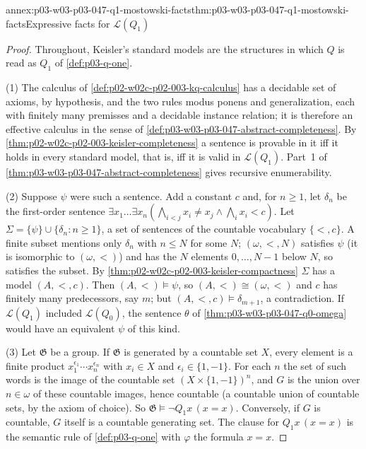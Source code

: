 \begin{annexitem}{annex:p03-w03-p03-047-q1-mostowski-facts}{thm:p03-w03-p03-047-q1-mostowski-facts}{Expressive facts for \(\mathscr L(Q_1)\)}
\begin{proof}
Throughout, Keisler's standard models are the structures in which \(Q\) is
read as \(Q_1\) of \cref{def:p03-q-one}.

(1) The calculus of \cref{def:p02-w02c-p02-003-kq-calculus} has a decidable
set of axioms, by hypothesis, and the two rules modus ponens and
generalization, each with finitely many premisses and a decidable instance
relation; it is therefore an effective calculus in the sense of
\cref{def:p03-w03-p03-047-abstract-completeness}.  By
\cref{thm:p02-w02c-p02-003-keisler-completeness} a sentence is provable in
it iff it holds in every standard model, that is, iff it is valid in
\(\mathscr L(Q_1)\).  Part~1 of
\cref{thm:p03-w03-p03-047-abstract-completeness} gives recursive
enumerability.

(2) Suppose \(\psi\) were such a sentence.  Add a constant \(c\) and, for
\(n\ge1\), let \(\delta_n\) be the first-order sentence
\(\exists x_1\ldots\exists x_n(\bigwedge_{i<j}x_i\ne x_j\land\bigwedge_i x_i<c)\).
Let \(\Sigma=\{\psi\}\cup\{\delta_n:n\ge1\}\), a set of sentences of the
countable vocabulary \(\{<,c\}\).  A finite subset mentions only
\(\delta_n\) with \(n\le N\) for some \(N\); \((\omega,<,N)\) satisfies
\(\psi\) (it is isomorphic to \((\omega,<)\)) and has the \(N\) elements
\(0,\ldots,N-1\) below \(N\), so satisfies the subset.  By
\cref{thm:p02-w02c-p02-003-keisler-compactness} \(\Sigma\) has a model
\((A,<,c)\).  Then \((A,<)\models\psi\), so \((A,<)\cong(\omega,<)\) and
\(c\) has finitely many predecessors, say \(m\); but
\((A,<,c)\models\delta_{m+1}\), a contradiction.  If \(\mathscr L(Q_1)\)
included \(\mathscr L(Q_0)\), the sentence \(\theta\) of
\cref{thm:p03-w03-p03-047-q0-omega} would have an equivalent \(\psi\) of
this kind.

(3) Let \(\mathfrak G\) be a group.  If \(\mathfrak G\) is generated by a
countable set \(X\), every element is a finite product
\(x_1^{\epsilon_1}\cdots x_n^{\epsilon_n}\) with \(x_i\in X\) and
\(\epsilon_i\in\{1,-1\}\).  For each \(n\) the set of such words is the image
of the countable set \((X\times\{1,-1\})^n\), and \(G\) is the union over
\(n\in\omega\) of these countable images, hence countable (a countable union
of countable sets, by the axiom of choice).  So \(\mathfrak G\models\neg
Q_1x\,(x=x)\).  Conversely, if \(G\) is countable, \(G\) itself is a
countable generating set.  The clause for \(Q_1x\,(x=x)\) is the semantic
rule of \cref{def:p03-q-one} with \(\varphi\) the formula \(x=x\).
\end{proof}
\end{annexitem}


